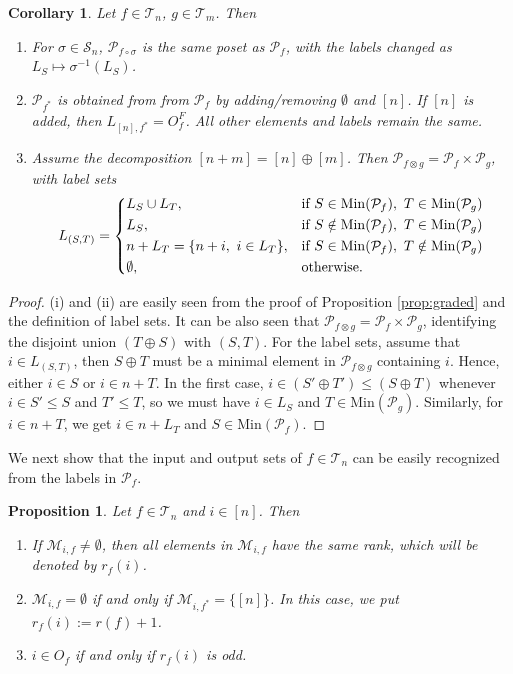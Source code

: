 \documentclass[12pt]{article}
\newtheorem{coro}{Corollary}
\newtheorem{prop}{Proposition}
\theoremstyle{definition}
\theoremstyle{remark}
\def\Me{\mathcal M}
\def\Te{\mathcal T}
\def\Pe{\mathcal P}
\def\permut{\mathscr{S}}
\begin{document}
\begin{coro}\label{coro:Pf} Let $f\in \Te_n$, $g\in \Te_m$. Then
\begin{enumerate}
\item[(i)] For $\sigma\in \permut_n$, $\Pe_{f\circ\sigma}$ is the same poset as $\Pe_f$, with the labels
changed as $L_S\mapsto \sigma^{-1}(L_S)$.


\item[(ii)] $\Pe_{f^*}$ is obtained from from $\Pe_f$ by adding/removing $\emptyset$ and
$[n]$. If $[n]$ is added, then  $L_{[n],f^*}=O_f^F$.  All other elements and labels remain the same. 
\item[(iii)] Assume the decomposition $[n+m]=[n]\oplus[m]$. Then 
$\Pe_{f\otimes g}= \Pe_f\times \Pe_g$, with label sets
\[
L_{(S,T)}=\begin{dcases} L_S\cup L_T, & \text{if } S\in \mathrm{Min}(\Pe_f),\ T\in
\mathrm{Min}(\Pe_g)\\
L_S, & \text{if } S\notin \mathrm{Min}(\Pe_f),\ T\in
\mathrm{Min}(\Pe_g)\\
n+ L_T=\{n+i,\ i\in L_T\}, &\text{if }S \in \mathrm{Min}(\Pe_f),\ T\notin
\mathrm{Min}(\Pe_g)\\
\emptyset, & \text{otherwise}.
\end{dcases}
\]



\end{enumerate}


\end{coro}


\begin{proof} (i) and (ii) are easily seen from the proof of Proposition
\ref{prop:graded} and the definition of label sets. It can be also seen that
$\Pe_{f\otimes g}=\Pe_f\times \Pe_g$, identifying the disjoint union $(T\oplus S)$ with $(S,T)$. 
For the label sets, assume that $i\in L_{(S,T)}$, then $S\oplus T$ must be a minimal
element in $\Pe_{f\otimes g}$ containing $i$. Hence, either $i\in S$ or $i\in n+T$. In the
first case, $i\in (S'\oplus T')\le (S\oplus T)$ whenever  $i\in S'\le S$ and $T'\le T$, so we must have 
$i\in L_S$ and $T\in \mathrm{Min}(\Pe_g)$. Similarly, for $i\in n+T$, we get $i\in n+L_T$
and $S\in \mathrm{Min}(\Pe_f)$. 


\end{proof}


We next show that the input and output sets of $f\in \Te_n$ can be easily recognized from
the labels in $\Pe_f$. 

\begin{prop}\label{prop:pfinput} Let $f\in \Te_n$ and $i\in [n]$. Then
\begin{enumerate}
\item[(i)] If $\Me_{i,f}\ne
\emptyset$, then all elements in $\Me_{i,f}$  have the same rank,  which will be
denoted by $r_f(i)$. 
\item[(ii)] $\Me_{i,f}=\emptyset$ if and only if $\Me_{i,f^*}=\{[n]\}$. In this case, we put $r_f(i):=r(f)+1$. 
\item [(iii)] $i\in O_f$ if and only if $r_f(i)$ is odd.

\end{enumerate}
\end{prop}
\end{document}
